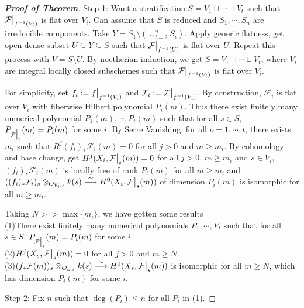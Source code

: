 \documentclass{ctexart}
\begin{document}
\begin{proof}[\textbf{\emph{Proof of Theorem}}]
    Step 1: Want a stratification $S = V_{1} \sqcup \cdots \sqcup V_{t}$ such that $\mathcal{F}\big{|}_{f^{-1}(V_{i})}$ is flat over $V_{i}$.
    Can assume that $S$ is reduced and $S_{1}, \cdots, S_{n}$ are irreducible components.
    Take $Y = S_{1} \setminus (\cup_{i = 2}^{n} S_{i})$.
    Apply generic flatness, get open dense subset $U \subseteq Y \subseteq S$ such that $\mathcal{F}\big{|}_{f^{-1}(U)}$ is flat over $U$.
    Repeat this process with $V = S \setminus U$.
    By noetherian induction, we get $S = V_{1} \sqcap \cdots \sqcup V_{t}$, where $V_{i}$ are integral locally closed subschemes such that $\mathcal{F}\big{|}_{f^{-1}(V_{i})}$ is flat over $V_{i}$.
    \par
    For simplicity, set $f_{i} := f\big{|}_{f^{-1}(V_{i})}$ and $\mathcal{F}_{i} := \mathcal{F}\big{|}_{f^{-1}(V_{i})}$.
    By construction, $\mathcal{F}_{i}$ is flat over $V_{i}$ with fiberwise Hilbert polynomial $P_{i}(m)$.
    Thus there exist finitely many numerical polynomial $P_{1}(m), \cdots, P_{t}(m)$ such that for all $s\in S$, $P_{\mathcal{F}\big{|}_{s}}(m) = P_{i}(m)$ for some $i$.
    By Serre Vanishing, for all $o = 1, \cdots, t$, there exists $m_{i}$ such that $R^{j}(f_{i})_{\ast}\mathcal{F}_{i}(m) = 0$ for all $j > 0$ and $m \ge m_{i}$.
    By cohomology and base change, get $H^{j}(X_{i}, \mathcal{F}\big{|}_{s}(m)) = 0$ for all $j > 0$, $m \ge m_{i}$ and $s\in V_{i}$,
    $(f_{i})_{\ast}\mathcal{F}_{i}(m)$ is locally free of rank $P_{i}(m)$ for all $m \ge m_{i}$ and $((f_{i})_{\ast}\mathcal{F}_{i})_{s} \otimes_{\mathcal{O}_{V_{i}, s}} k(s) \overset{\sim}{\longrightarrow} H^{0}(X_{i}, \mathcal{F}\big{|}_{s}(m))$ of dimension $P_{i}(m)$ is isomorphic for all $m \ge m_{i}$.
    \par
    Taking $N >> \max\{m_{i}\}$, we have gotten some results \\
    (1)There exist finitely many numerical polynomials $P_{1}, \cdots, P_{t}$ such that for all $s\in S$, $P_{\mathcal{F}\big{|}_{s}}(m) = P_{i}(m)$ for some $i$. \\
    (2)$H^{j}(X_{s}, \mathcal{F}\big{|}_{s}(m)) = 0$ for all $j > 0$ and $m \ge N$. \\
    (3)$(f_{\ast}\mathcal{F}(m))_{s} \otimes_{\mathcal{O}_{S, s}} k(s) \overset{\sim}{\longrightarrow} H^{0}(X_{s}, \mathcal{F}\big{|}_{s}(m))$ is isomorphic for all $m \ge N$, which has dimension $P_{i}(m)$ for some $i$.
    \par
    Step 2: Fix $n$ such that $\deg(P_{i}) \le n$ for all $P_{i}$ in (1).

\end{proof}
\end{document}
